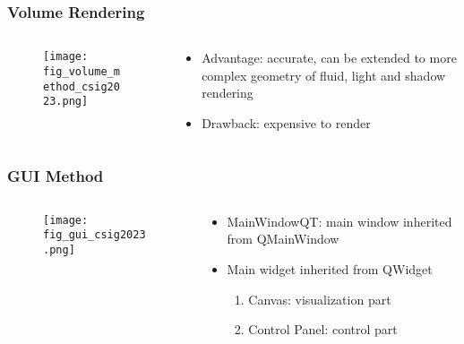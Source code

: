 \begin{frame}
    \frametitle{Volume Rendering}
    \begin{columns}[c]
        \begin{column}{0.58\textwidth} %
            \begin{figure}[H]
                \centering
                \texttt{[image: fig\_volume\_method\_csig2023.png]}
            \end{figure}
        \end{column}
        \begin{column}{0.4\textwidth} %
            \begin{itemize}
                \item Advantage: accurate, can be extended to more complex geometry of fluid, light and shadow rendering
                \item Drawback: expensive to render
            \end{itemize}
        \end{column}
    \end{columns}
\end{frame}

\begin{frame}
    \frametitle{GUI Method}
    \begin{columns}[c]
        \begin{column}{0.58\textwidth} %
            \begin{figure}[H]
                \centering
                \texttt{[image: fig\_gui\_csig2023.png]}
            \end{figure}
        \end{column}
        \begin{column}{0.4\textwidth} %
            \begin{itemize}
                \item MainWindowQT: main window inherited from QMainWindow
                \item Main widget inherited from QWidget
                    \begin{enumerate}
                        \item Canvas: visualization part
                        \item Control Panel: control part
                    \end{enumerate}
            \end{itemize}
        \end{column}
    \end{columns}
\end{frame}

